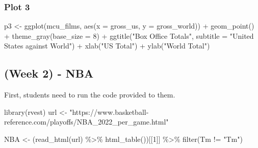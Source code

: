 \documentclass[
]{article}
\newenvironment{Shaded}{\begin{snugshade}}{\end{snugshade}}
\newcommand{\AttributeTok}[1]{\textcolor[rgb]{0.77,0.63,0.00}{#1}}
\newcommand{\DecValTok}[1]{\textcolor[rgb]{0.00,0.00,0.81}{#1}}
\newcommand{\FunctionTok}[1]{\textcolor[rgb]{0.00,0.00,0.00}{#1}}
\newcommand{\NormalTok}[1]{#1}
\newcommand{\OtherTok}[1]{\textcolor[rgb]{0.56,0.35,0.01}{#1}}
\newcommand{\SpecialCharTok}[1]{\textcolor[rgb]{0.00,0.00,0.00}{#1}}
\newcommand{\StringTok}[1]{\textcolor[rgb]{0.31,0.60,0.02}{#1}}
\begin{document}
\hypertarget{plot-3}{%
\subsubsection{Plot 3}\label{plot-3}}

\begin{Shaded}
\begin{Highlighting}[]
\NormalTok{p3 }\OtherTok{\textless{}{-}} \FunctionTok{ggplot}\NormalTok{(mcu\_films, }\FunctionTok{aes}\NormalTok{(}\AttributeTok{x =}\NormalTok{ gross\_us,}
                            \AttributeTok{y =}\NormalTok{ gross\_world)) }\SpecialCharTok{+}
    \FunctionTok{geom\_point}\NormalTok{() }\SpecialCharTok{+}
      \FunctionTok{theme\_gray}\NormalTok{(}\AttributeTok{base\_size =} \DecValTok{8}\NormalTok{) }\SpecialCharTok{+}
  \FunctionTok{ggtitle}\NormalTok{(}\StringTok{"Box Office Totals"}\NormalTok{, }\AttributeTok{subtitle =} \StringTok{"United States against World"}\NormalTok{) }\SpecialCharTok{+}
  \FunctionTok{xlab}\NormalTok{(}\StringTok{"US Total"}\NormalTok{) }\SpecialCharTok{+} \FunctionTok{ylab}\NormalTok{(}\StringTok{"World Total"}\NormalTok{)}
\end{Highlighting}
\end{Shaded}

\hypertarget{week-2---nba}{%
\subsection{(Week 2) - NBA}\label{week-2---nba}}

First, students need to run the code provided to them.

\begin{Shaded}
\begin{Highlighting}[]
\FunctionTok{library}\NormalTok{(rvest)}
\NormalTok{url }\OtherTok{\textless{}{-}} \StringTok{"https://www.basketball{-}reference.com/playoffs/NBA\_2022\_per\_game.html"}

\NormalTok{NBA }\OtherTok{\textless{}{-}}\NormalTok{ (}\FunctionTok{read\_html}\NormalTok{(url) }\SpecialCharTok{\%\textgreater{}\%} \FunctionTok{html\_table}\NormalTok{())[[}\DecValTok{1}\NormalTok{]] }\SpecialCharTok{\%\textgreater{}\%} \FunctionTok{filter}\NormalTok{(Tm }\SpecialCharTok{!=} \StringTok{"Tm"}\NormalTok{)}
\end{Highlighting}
\end{Shaded}
\end{document}
